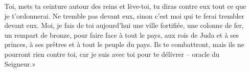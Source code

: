 Toi, mets ta ceinture autour des reins et lève-toi,
	tu diras contre eux tout ce que je t’ordonnerai.
Ne tremble pas devant eux, sinon c’est moi qui te ferai trembler devant eux.
Moi, je fais de toi aujourd’hui une ville fortifiée,
	une colonne de fer, un rempart de bronze,
	pour faire face à tout le pays,
	aux rois de Juda et à ses princes,
	à ses prêtres et à tout le peuple du pays.
Ils te combattront, mais ils ne pourront rien contre toi,
	car je suis avec toi pour te délivrer – oracle du Seigneur.»
